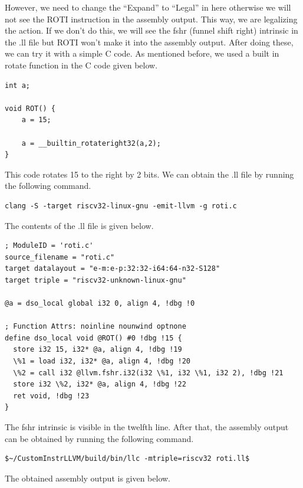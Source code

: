 However, we need to change the “Expand” to “Legal” in here otherwise we will not see the ROTI instruction in the assembly output.  This way, we are legalizing the action. If we don’t do this, we will see the fshr (funnel shift right) intrinsic in the .ll file but ROTI won’t make it into the assembly output. After doing these, we can try it with a simple C code. As mentioned before, we used a built in rotate function in the C code given below. 

\begin{lstlisting}
int a;

void ROT() {
	a = 15;
	
	a = __builtin_rotateright32(a,2);	
}
\end{lstlisting}

This code rotates 15 to the right by 2 bits. We can obtain the .ll file by running the following command.

\begin{lstlisting}
clang -S -target riscv32-linux-gnu -emit-llvm -g roti.c
\end{lstlisting}

The contents of the .ll file is given below.

\begin{lstlisting}
; ModuleID = 'roti.c'
source_filename = "roti.c"
target datalayout = "e-m:e-p:32:32-i64:64-n32-S128"
target triple = "riscv32-unknown-linux-gnu"

@a = dso_local global i32 0, align 4, !dbg !0

; Function Attrs: noinline nounwind optnone
define dso_local void @ROT() #0 !dbg !15 {
  store i32 15, i32* @a, align 4, !dbg !19
  \%1 = load i32, i32* @a, align 4, !dbg !20
  \%2 = call i32 @llvm.fshr.i32(i32 \%1, i32 \%1, i32 2), !dbg !21
  store i32 \%2, i32* @a, align 4, !dbg !22
  ret void, !dbg !23
}
\end{lstlisting}

The fshr intrinsic is visible in the twelfth line. After that, the assembly output can be obtained by running the following command. 

\begin{lstlisting}
$~/CustomInstrLLVM/build/bin/llc -mtriple=riscv32 roti.ll$
\end{lstlisting}

The obtained assembly output is given below.

